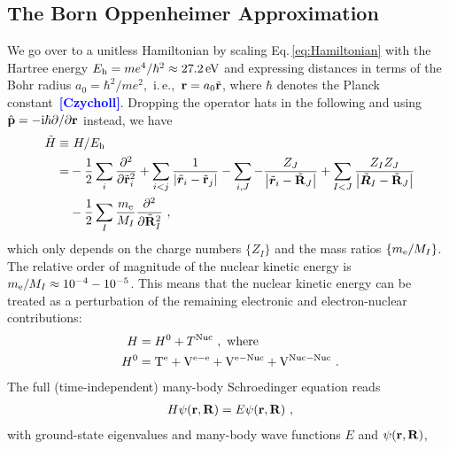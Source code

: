 \documentclass[a4paper,12pt]{book}
\renewcommand{\b}[1]{\boldsymbol{#1}}
\newcommand{\im}{{\rm i}}
\newcommand{\CITE}[1]{\textcolor{blue}{{\bf [#1]}}}
\begin{document}
\subsection{The Born Oppenheimer Approximation}
We go over to a unitless Hamiltonian by scaling Eq.\,\eqref{eq:Hamiltonian} with the Hartree energy $E_{\rm h} = me^4 / \hbar^2 \approx 27.2\,{\rm eV}$ and expressing distances in terms of the Bohr radius $a_0 = \hbar^2 / m e^2$,~i.\,e.,~${\bf r} = a_0 \tilde{\bf r}$, where $\hbar$ denotes the Planck constant~\CITE{Czycholl}. Dropping the operator hats in the following and using $\hat{\bf p}=-\im \hbar \partial / \partial {\bf r}$ instead, we have
\begin{align}
\begin{split}
    \tilde H 
        \equiv& ~H / E_{\rm h} \\
        =& 
        - \frac{1}{2} \sum_i \frac{\partial^2}{\partial \tilde{\bf r}_i^2}
        + \sum_{i < j} \frac{1}{\left|\tilde{\b r}_{i}-\tilde{\bf r}_{j}\right|}
        - \sum_{i, J} -\frac{Z_J}{\left|\tilde{\b r}_{i}-\tilde{\bf R}_{J}\right|}
        + \sum_{I < J} \frac{Z_{I} Z_{J}}{
            \left|\tilde{\b R}_{I}-\tilde{\bf R}_{J}\right|} 
        \\
        &- \frac{1}{2} \sum_I \frac{m_{\rm e}}{M_I} \frac{\partial^2}{\partial \tilde{\bf R}_I^2}~,
    \label{eq:Hscaled}
\end{split}
\end{align}
which only depends on the charge numbers $\{Z_I\}$ and the mass ratios $\{ m_{\rm e} / M_I \}$. The relative order of magnitude of the nuclear kinetic energy is $m_{\rm e} / M_I \approx 10^{-4} - 10^{-5}$. This means that the nuclear kinetic energy can be treated as a perturbation of the remaining electronic and electron-nuclear contributions:
\begin{align}
    H   &= H^0 + T^{\rm Nuc}~, \text{ where} 
    \label{eq:H=H0+T}
    \\
    H^0 &=
        {\mathrm{T}}^{\mathrm{e}}
        + {\mathrm{V}}^{\mathrm{e}-\mathrm{e}}
        + {\mathrm{V}}^{\mathrm{e}-\mathrm{Nuc}}
        + {\mathrm{V}}^{\mathrm{Nuc}-\mathrm{Nuc}}~.
    \label{eq:H0}
\end{align}
The full (time-independent) many-body Schroedinger equation reads
\begin{align}
    H \psi ({\bf r}, {\bf R}) = E \psi ({\bf r}, {\bf R})~,
    \label{eq:Schroedinger1}
\end{align}
with ground-state eigenvalues and many-body wave functions $E$ and \mbox{$\psi ({\bf r}, {\bf R})$},
\end{document}
